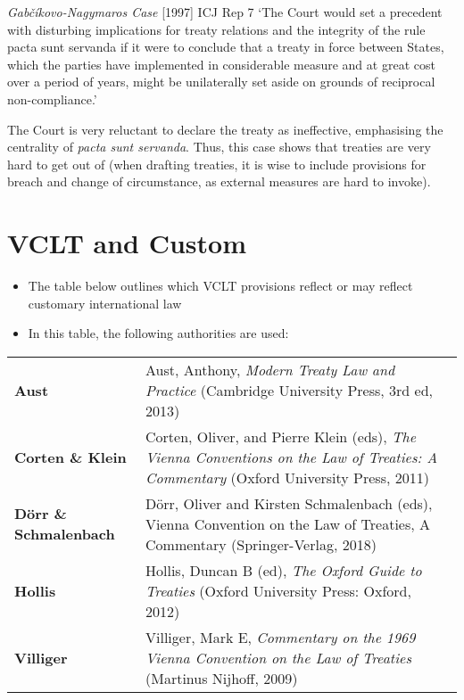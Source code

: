 \begin{casedetails}{\textit{Gabčíkovo-Nagymaros Case} [1997] ICJ Rep 7}
	`The Court would set a precedent with disturbing implications for treaty relations and the integrity of the rule pacta sunt servanda if it were to conclude that a treaty in force between States, which the parties have implemented in considerable measure and at great cost over a period of years, might be unilaterally set aside on grounds of reciprocal non-compliance.'

    \vspace{\baselineskip}

	The Court is very reluctant to declare the treaty as ineffective, emphasising the centrality of \textit{pacta sunt servanda}. Thus, this case shows that treaties are very hard to get out of (when drafting treaties, it is wise to include provisions for breach and change of circumstance, as external measures are hard to invoke).
\end{casedetails}

\section{VCLT and Custom}

\begin{itemize}
    \item The table below outlines which VCLT provisions reflect or may reflect customary international law
    \item In this table, the following authorities are used:
\end{itemize}

{\renewcommand{\arraystretch}{1.2}\begin{longtable}{>{\raggedright\arraybackslash}p{}>{\raggedright\arraybackslash}p{}}
    \textbf{Aust} & Aust, Anthony, \textit{Modern Treaty Law and Practice} (Cambridge University Press, 3rd ed, 2013) \\
    \textbf{Corten \& Klein} & Corten, Oliver, and Pierre Klein (eds), \textit{The Vienna Conventions on the Law of Treaties: A Commentary} (Oxford University Press, 2011) \\
    \textbf{Dörr \& Schmalenbach} & Dörr, Oliver and Kirsten Schmalenbach (eds), Vienna Convention on
    the Law of Treaties, A Commentary (Springer-Verlag, 2018) \\
    \textbf{Hollis} & Hollis, Duncan B (ed), \textit{The Oxford Guide to Treaties} (Oxford University Press: Oxford, 2012) \\
    \textbf{Villiger} & Villiger, Mark E, \textit{Commentary on the 1969 Vienna Convention on the Law of Treaties} (Martinus Nijhoff, 2009)
\end{longtable}}

